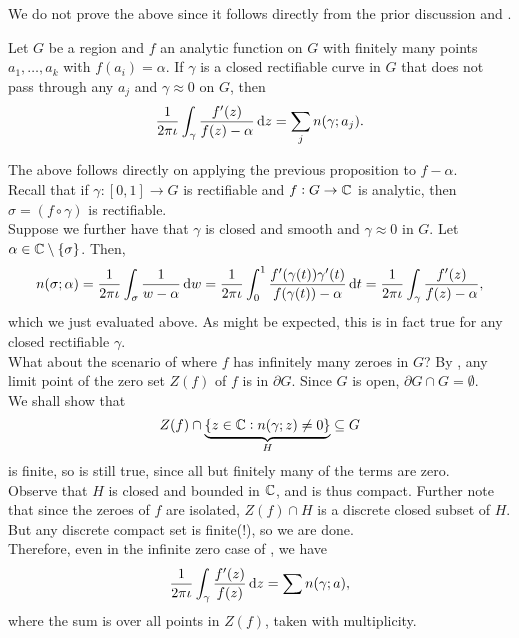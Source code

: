 		We do not prove the above since it follows directly from the prior discussion and .

		\begin{corollary}
			\label{cor 2.38}
			Let $G$ be a region and $f$ an analytic function on $G$ with finitely many points $a_1,\ldots,a_k$ with $f(a_i) = \alpha$. If $\gamma$ is a closed rectifiable curve in $G$ that does not pass through any $a_j$ and $\gamma \approx 0$ on $G$, then
			\[ \frac{1}{2\pi\iota} \int_\gamma \frac{f'(z)}{f(z)-\alpha} \dif z = \sum_j n(\gamma;a_j). \]
		\end{corollary}

		The above follows directly on applying the previous proposition to $f-\alpha$.\\

		Recall that if $\gamma:[0,1] \to G$ is rectifiable and $f:G\to\mathbb{C}$ is analytic, then $\sigma = (f\circ\gamma)$ is rectifiable. \\
		Suppose we further have that $\gamma$ is closed and smooth and $\gamma \approx 0$ in $G$. Let $\alpha \in \mathbb{C} \setminus \{\sigma\}$. Then,
		\[ n(\sigma;\alpha) = \frac{1}{2\pi\iota} \int_\sigma \frac{1}{w-\alpha} \dif w = \frac{1}{2\pi\iota} \int_0^1 \frac{f'(\gamma(t))\gamma'(t)}{f(\gamma(t)) - \alpha} \dif t = \frac{1}{2\pi\iota} \int_\gamma \frac{f'(z)}{f(z)-\alpha}, \]
		which we just evaluated above. As might be expected, this is in fact true for any closed rectifiable $\gamma$.\\

		What about the scenario of  where $f$ has infinitely many zeroes in $G$? By , any limit point of the zero set $Z(f)$ of $f$ is in $\partial G$. Since $G$ is open, $\partial G \cap G = \emptyset$. \\
		We shall show that
		\[ Z(f) \cap \underbrace{\{ z \in \mathbb{C} : n(\gamma;z) \ne 0 \}}_{H} \subseteq G \]
		is finite, so  is still true, since all but finitely many of the terms are zero.\\
		Observe that $H$ is closed and bounded in $\mathbb{C}$, and is thus compact. Further note that since the zeroes of $f$ are isolated, $Z(f) \cap H$ is a discrete closed subset of $H$. But any discrete compact set is finite(!), so we are done.\\
		Therefore, even in the infinite zero case of , we have
		\[ \frac{1}{2\pi\iota} \int_\gamma \frac{f'(z)}{f(z)} \dif z = \sum n(\gamma;a), \]
		where the sum is over all points in $Z(f)$, taken with multiplicity.


